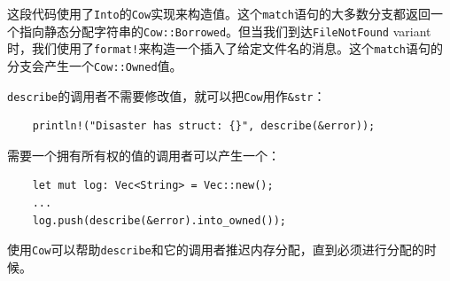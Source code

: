 这段代码使用了\texttt{Into}的\texttt{Cow}实现来构造值。这个\texttt{match}语句的大多数分支都返回一个指向静态分配字符串的\texttt{Cow::Borrowed}。但当我们到达\texttt{FileNotFound} variant时，我们使用了\texttt{format!}来构造一个插入了给定文件名的消息。这个\texttt{match}语句的分支会产生一个\texttt{Cow::Owned}值。

\texttt{describe}的调用者不需要修改值，就可以把\texttt{Cow}用作\texttt{\&str}：
\begin{verbatim}
    println!("Disaster has struct: {}", describe(&error));
\end{verbatim}

需要一个拥有所有权的值的调用者可以产生一个：
\begin{verbatim}
    let mut log: Vec<String> = Vec::new();
    ...
    log.push(describe(&error).into_owned());
\end{verbatim}

使用\texttt{Cow}可以帮助\texttt{describe}和它的调用者推迟内存分配，直到必须进行分配的时候。
